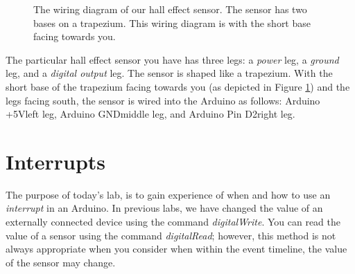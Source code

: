 \documentclass[11pt,a4paper]{article}
\begin{document}
\begin{figure}[ht]
    \begin{center}
    \end{center}
    \caption{The wiring diagram of our hall effect sensor. The sensor has two bases on a trapezium. This wiring diagram is with the short base facing towards you.}
    \label{fig:hall-effect-sensor}
\end{figure}

\noindent
The particular hall effect sensor you have has three legs: a \textit{power} leg, a \textit{ground} leg, and a \textit{digital output} leg. The sensor is shaped like a trapezium. With the short base of the trapezium facing towards you (as depicted in Figure \ref{fig:hall-effect-sensor}) and the legs facing south, the sensor is wired into the Arduino as follows: Arduino +5V\textrightarrow left leg, Arduino GND\textrightarrow middle leg, and Arduino Pin D2\textrightarrow right leg.\\

\section*{Interrupts}
The purpose of today's lab, is to gain experience of when and how to use an \textit{interrupt} in an Arduino. In previous labs, we have changed the value of an externally connected device using the command \textit{digitalWrite}. You can read the value of a sensor using the command \textit{digitalRead}; however, this method is not always appropriate when you consider when within the event timeline, the value of the sensor may change.\\
\end{document}
